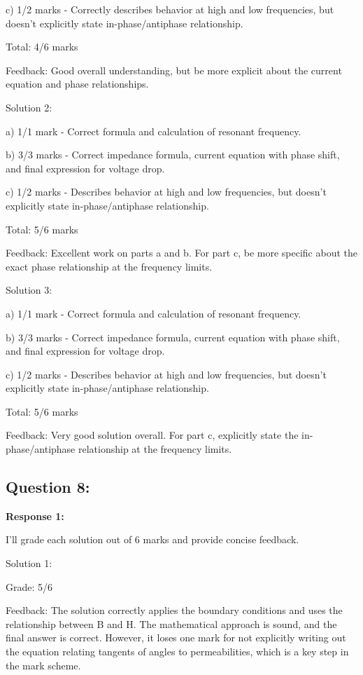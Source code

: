 \documentclass[a4paper,11pt]{article}
\begin{document}
c) 1/2 marks - Correctly describes behavior at high and low frequencies, but doesn't explicitly state in-phase/antiphase relationship.

Total: 4/6 marks

Feedback: Good overall understanding, but be more explicit about the current equation and phase relationships.

Solution 2:

a) 1/1 mark - Correct formula and calculation of resonant frequency.

b) 3/3 marks - Correct impedance formula, current equation with phase shift, and final expression for voltage drop.

c) 1/2 marks - Describes behavior at high and low frequencies, but doesn't explicitly state in-phase/antiphase relationship.

Total: 5/6 marks

Feedback: Excellent work on parts a and b. For part c, be more specific about the exact phase relationship at the frequency limits.

Solution 3:

a) 1/1 mark - Correct formula and calculation of resonant frequency.

b) 3/3 marks - Correct impedance formula, current equation with phase shift, and final expression for voltage drop.

c) 1/2 marks - Describes behavior at high and low frequencies, but doesn't explicitly state in-phase/antiphase relationship.

Total: 5/6 marks

Feedback: Very good solution overall. For part c, explicitly state the in-phase/antiphase relationship at the frequency limits.

\subsection*{Question 8:}

\textbf{Response 1:}

I'll grade each solution out of 6 marks and provide concise feedback.

Solution 1:

Grade: 5/6

Feedback:
The solution correctly applies the boundary conditions and uses the relationship between B and H. The mathematical approach is sound, and the final answer is correct. However, it loses one mark for not explicitly writing out the equation relating tangents of angles to permeabilities, which is a key step in the mark scheme.
\end{document}
